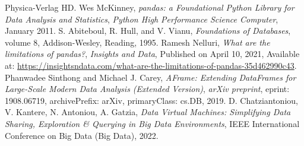 \documentclass[journal]{IEEEtran} %
\begin{document}
\begin{thebibliography}{00}
    Physica-Verlag HD.
    Wes McKinney,
    \emph{pandas: a Foundational Python Library for Data Analysis and Statistics},
    \emph{Python High Performance Science Computer},
    January 2011.
    S. Abiteboul, R. Hull, and V. Vianu,
    \emph{Foundations of Databases},
    volume 8,
    Addison-Wesley,
    Reading,
    1995.
    Ramesh Nelluri,
    \emph{What are the limitations of pandas?},
    \emph{Insights and Data},
    Published on April 10, 2021,
    Available at: \url{https://insightsndata.com/what-are-the-limitations-of-pandas-35d462990c43}.
    Phanwadee Sinthong and Michael J. Carey,
    \emph{AFrame: Extending DataFrames for Large-Scale Modern Data Analysis (Extended Version)},
    \emph{arXiv preprint},
    eprint: 1908.06719,
    archivePrefix: arXiv,
    primaryClass: cs.DB,
    2019.
    D. Chatziantoniou, V. Kantere, N. Antoniou, A. Gatzia,
    \emph{Data Virtual Machines: Simplifying Data Sharing,
    Exploration \& Querying in Big Data Environments},
    IEEE International Conference on Big Data (Big Data),
    2022.
    
\end{thebibliography}
\end{document}
